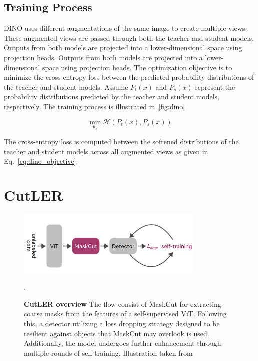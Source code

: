 \subsection{Training Process}
DINO uses different augmentations of the same image to create multiple views. These augmented views are passed through both the teacher and student models. Outputs from both models are projected into a lower-dimensional space using projection heads. Outputs from both models are projected into a lower-dimensional space using projection heads. The optimization objective is to minimize the cross-entropy loss between the predicted probability distributions of the teacher and student models. Assume \(P_t(x)\) and \(P_s(x)\) represent the probability distributions predicted by the teacher and student models, respectively. The training process is illustrated in~\ref{fig:dino}

\begin{equation}
	\label{eq:dino_objective}
	\min_{\theta_s} \mathcal{H}(P_t(x), P_s(x))
\end{equation}

The cross-entropy loss is computed between the softened distributions of the teacher and student models across all augmented views as given in Eq.~\ref{eq:dino_objective}.

\section{CutLER}
\begin{figure}
	\centering
	\includegraphics[width=0.8\textwidth]{Images/main/cutler_flow.png}
	\caption[\textbf{CutLER overview}]{\textbf{CutLER overview} The flow consist of MaskCut for extracting coarse masks from the features of a self-supervised ViT. Following this, a detector utilizing a loss dropping strategy designed to be resilient against objects that MaskCut may overlook is used. Additionally, the model undergoes further enhancement through multiple rounds of self-training. Illustration taken from~\cite{wang2023cut}}.
	\label{fig:cutler_flow}
\end{figure} 

